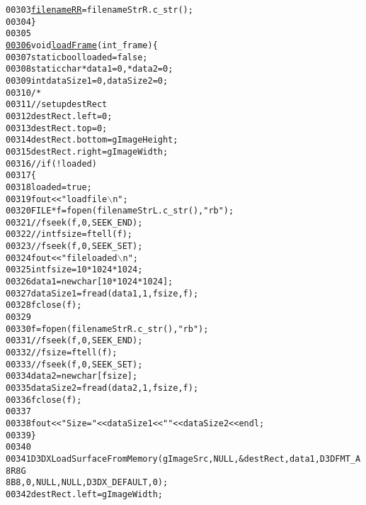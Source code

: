 \begin{footnotesize}
\begin{alltt}
00303         \hyperlink{config_8h_ac31be6060769b3c9c0c533e0cf269b28}{filenameRR} = filenameStrR.c\_str();
00304 \}
00305 
\hypertarget{main_8cpp_source_l00306}{}\hyperlink{main_8cpp_a117a4ee6ce2172cb8d6b4ac48a6c3645}{00306} \textcolor{keywordtype}{void} \hyperlink{main_8cpp_a117a4ee6ce2172cb8d6b4ac48a6c3645}{loadFrame}(\textcolor{keywordtype}{int} \_frame) \{
00307         \textcolor{keyword}{static} \textcolor{keywordtype}{bool} loaded = \textcolor{keyword}{false};
00308         \textcolor{keyword}{static} \textcolor{keywordtype}{char} *data1 = 0, *data2 = 0;
00309         \textcolor{keywordtype}{int} dataSize1 = 0, dataSize2 = 0;
00310         \textcolor{comment}{/*}
00311 \textcolor{comment}{        // set up destRect}
00312 \textcolor{comment}{        destRect.left = 0;}
00313 \textcolor{comment}{        destRect.top = 0;}
00314 \textcolor{comment}{        destRect.bottom = gImageHeight;}
00315 \textcolor{comment}{        destRect.right = gImageWidth;}
00316 \textcolor{comment}{        //if (!loaded)}
00317 \textcolor{comment}{        \{}
00318 \textcolor{comment}{        loaded = true;}
00319 \textcolor{comment}{        fout << "load file\(\backslash\)n";}
00320 \textcolor{comment}{        FILE *f = fopen(filenameStrL.c\_str(), "rb");}
00321 \textcolor{comment}{        //fseek(f, 0, SEEK\_END);}
00322 \textcolor{comment}{        //int fsize = ftell(f);}
00323 \textcolor{comment}{        //fseek(f, 0, SEEK\_SET);}
00324 \textcolor{comment}{        fout << "file loaded \(\backslash\)n";}
00325 \textcolor{comment}{        int fsize = 10 * 1024 * 1024;}
00326 \textcolor{comment}{        data1 = new char[10*1024*1024];}
00327 \textcolor{comment}{        dataSize1 = fread(data1, 1, fsize, f);}
00328 \textcolor{comment}{        fclose(f);}
00329 \textcolor{comment}{}
00330 \textcolor{comment}{        f = fopen(filenameStrR.c\_str(), "rb");}
00331 \textcolor{comment}{        //fseek(f, 0, SEEK\_END);}
00332 \textcolor{comment}{        //fsize = ftell(f);}
00333 \textcolor{comment}{        //fseek(f, 0, SEEK\_SET);}
00334 \textcolor{comment}{        data2 = new char[fsize];}
00335 \textcolor{comment}{        dataSize2 = fread(data2, 1, fsize, f);}
00336 \textcolor{comment}{        fclose(f);}
00337 \textcolor{comment}{}
00338 \textcolor{comment}{        fout << "Size = " << dataSize1 << " " << dataSize2 << endl;}
00339 \textcolor{comment}{        \}}
00340 \textcolor{comment}{}
00341 \textcolor{comment}{        D3DXLoadSurfaceFromMemory(gImageSrc, NULL, &destRect, data1, D3DFMT\_A8R8G
      8B8, 0, NULL, NULL,D3DX\_DEFAULT, 0);}
00342 \textcolor{comment}{        destRect.left = gImageWidth;}

\end{alltt}
\end{footnotesize}
